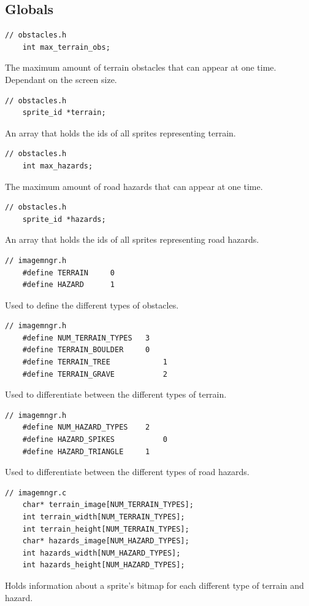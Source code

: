 \documentclass{article}
\begin{document}
\subsection*{Globals}
\begin{lstlisting}[style=CStyle]
	// obstacles.h
	int max_terrain_obs;	
\end{lstlisting}
The maximum amount of terrain obstacles that can appear at one time. Dependant on the screen size.
\begin{lstlisting}[style=CStyle]
	// obstacles.h
	sprite_id *terrain;
\end{lstlisting}
An array that holds the ids of all sprites representing terrain.
\begin{lstlisting}[style=CStyle]
	// obstacles.h
	int max_hazards;
\end{lstlisting}
The maximum amount of road hazards that can appear at one time. 
\begin{lstlisting}[style=CStyle]
	// obstacles.h
	sprite_id *hazards;
\end{lstlisting}
An array that holds the ids of all sprites representing road hazards.
\begin{lstlisting}[style=CStyle]
	// imagemngr.h
	#define TERRAIN     0
	#define HAZARD      1
\end{lstlisting}
Used to define the different types of obstacles.
\begin{lstlisting}[style=CStyle]
	// imagemngr.h
	#define NUM_TERRAIN_TYPES	3
	#define TERRAIN_BOULDER		0
	#define TERRAIN_TREE 			1
	#define TERRAIN_GRAVE			2
\end{lstlisting}
Used to differentiate between the different types of terrain.
\begin{lstlisting}[style=CStyle]
	// imagemngr.h
	#define NUM_HAZARD_TYPES	2
	#define HAZARD_SPIKES			0
	#define HAZARD_TRIANGLE		1
\end{lstlisting}
Used to differentiate between the different types of road hazards.
\begin{lstlisting}[style=CStyle]
	// imagemngr.c
	char* terrain_image[NUM_TERRAIN_TYPES];
	int terrain_width[NUM_TERRAIN_TYPES];
	int terrain_height[NUM_TERRAIN_TYPES];
	char* hazards_image[NUM_HAZARD_TYPES];
	int hazards_width[NUM_HAZARD_TYPES];
	int hazards_height[NUM_HAZARD_TYPES];
\end{lstlisting}
Holds information about a sprite's bitmap for each different type of terrain and hazard.
\newpage
\end{document}
